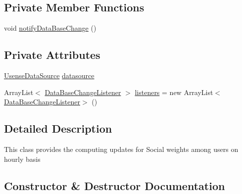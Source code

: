 \subsection*{Private Member Functions}
\begin{DoxyCompactItemize}
\item 
void \hyperlink{classcs_1_1usense_1_1bluetooth_1_1_on_new_hour_update_ab077ff7c27e637837cff94ca204a0814}{notify\+Data\+Base\+Change} ()
\end{DoxyCompactItemize}
\subsection*{Private Attributes}
\begin{DoxyCompactItemize}
\item 
\hyperlink{classcs_1_1usense_1_1db_1_1_usense_data_source}{Usense\+Data\+Source} \hyperlink{classcs_1_1usense_1_1bluetooth_1_1_on_new_hour_update_a9499fb14e1441d5fe2ea131919f14a46}{datasource}
\item 
Array\+List$<$ \hyperlink{interfacecs_1_1usense_1_1db_1_1_data_base_change_listener}{Data\+Base\+Change\+Listener} $>$ \hyperlink{classcs_1_1usense_1_1bluetooth_1_1_on_new_hour_update_aa0d7b5151c9ed9a0e6e2c83c63cbb7f5}{listeners} = new Array\+List$<$\hyperlink{interfacecs_1_1usense_1_1db_1_1_data_base_change_listener}{Data\+Base\+Change\+Listener}$>$ ()
\end{DoxyCompactItemize}


\subsection{Detailed Description}
This class provides the computing updates for Social weights among users on hourly basis 

\subsection{Constructor \& Destructor Documentation}
\hypertarget{classcs_1_1usense_1_1bluetooth_1_1_on_new_hour_update_af5363cd149e80b1b4abbeb44a0251e4e}{}
